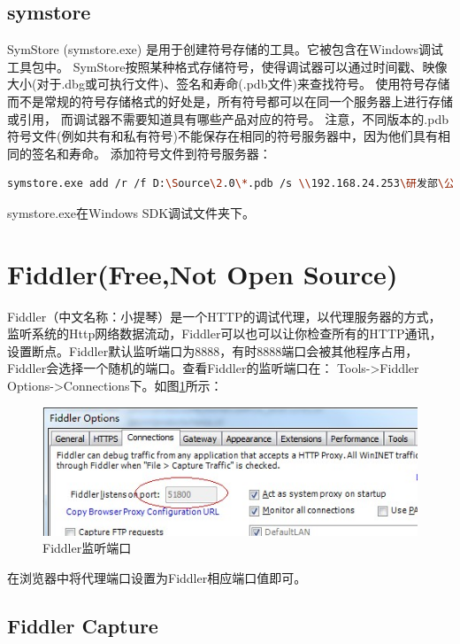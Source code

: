 \documentclass{book}
\begin{document}
\subsection{symstore}

SymStore (symstore.exe) 是用于创建符号存储的工具。它被包含在Windows调试工具包中。
SymStore按照某种格式存储符号，使得调试器可以通过时间戳、映像大小(对于.dbg或可执行文件)、签名和寿命(.pdb文件)来查找符号。
使用符号存储而不是常规的符号存储格式的好处是，所有符号都可以在同一个服务器上进行存储或引用，
而调试器不需要知道具有哪些产品对应的符号。
注意，不同版本的.pdb符号文件(例如共有和私有符号)不能保存在相同的符号服务器中，因为他们具有相同的签名和寿命。
添加符号文件到符号服务器：

\begin{lstlisting}[language=Bash]
symstore.exe add /r /f D:\Source\2.0\*.pdb /s \\192.168.24.253\研发部\公用\Develop\Debug\Symbol /t BRProduct /z pri
\end{lstlisting}

symstore.exe在Windows SDK调试文件夹下。

\section{Fiddler(Free,Not Open Source)}

Fiddler（中文名称：小提琴）是一个HTTP的调试代理，以代理服务器的方式，
监听系统的Http网络数据流动，Fiddler可以也可以让你检查所有的HTTP通讯，
设置断点。Fiddler默认监听端口为8888，有时8888端口会被其他程序占用，
Fiddler会选择一个随机的端口。查看Fiddler的监听端口在：
Tools->Fiddler Options->Connections下。如图\ref{fig:FiddlerListeningPort}所示：

\begin{figure}[htbp]
	\centering
	\includegraphics[scale=0.8]{FiddlerListeningPort.jpg}
	\caption{Fiddler监听端口}
	\label{fig:FiddlerListeningPort}
\end{figure}

在浏览器中将代理端口设置为Fiddler相应端口值即可。

\subsection{Fiddler Capture}
\end{document}
